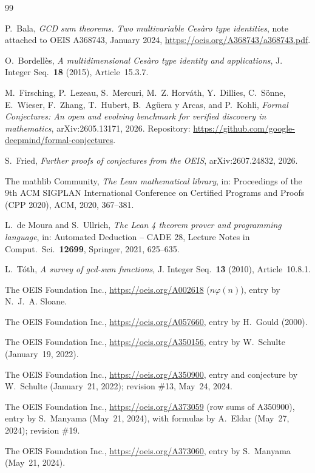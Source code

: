 \documentclass[11pt]{amsart}
\theoremstyle{plain}
\theoremstyle{definition}
\begin{document}
{\footnotesize
\begin{thebibliography}{99}

P.~Bala, \emph{GCD sum theorems. Two multivariable Ces\`aro type identities}, note attached to OEIS A368743, January 2024, \url{https://oeis.org/A368743/a368743.pdf}.

O.~Bordell\`es, \emph{A multidimensional Ces\`aro type identity and applications}, J. Integer Seq.\ \textbf{18} (2015), Article~15.3.7.

M.~Firsching, P.~Lezeau, S.~Mercuri, M.~Z. Horv\'ath, Y.~Dillies, C.~S\"onne, E.~Wieser, F.~Zhang, T.~Hubert, B.~Ag\"uera y Arcas, and P.~Kohli, \emph{Formal Conjectures: An open and evolving benchmark for verified discovery in mathematics}, arXiv:2605.13171, 2026. Repository: \url{https://github.com/google-deepmind/formal-conjectures}.

S.~Fried, \emph{Further proofs of conjectures from the OEIS}, arXiv:2607.24832, 2026.

The mathlib Community, \emph{The Lean mathematical library}, in: Proceedings of the 9th ACM SIGPLAN International Conference on Certified Programs and Proofs (CPP 2020), ACM, 2020, 367--381.

L.~de Moura and S.~Ullrich, \emph{The Lean 4 theorem prover and programming language}, in: Automated Deduction -- CADE 28, Lecture Notes in Comput.\ Sci.\ \textbf{12699}, Springer, 2021, 625--635.

L.~T\'oth, \emph{A survey of gcd-sum functions}, J. Integer Seq.\ \textbf{13} (2010), Article~10.8.1.

The OEIS Foundation Inc., \url{https://oeis.org/A002618} ($n\varphi(n)$), entry by N.~J.~A. Sloane.

The OEIS Foundation Inc., \url{https://oeis.org/A057660}, entry by H.~Gould (2000).

The OEIS Foundation Inc., \url{https://oeis.org/A350156}, entry by W.~Schulte (January~19, 2022).

The OEIS Foundation Inc., \url{https://oeis.org/A350900}, entry and conjecture by W.~Schulte (January~21, 2022); revision \#13, May~24, 2024.

The OEIS Foundation Inc., \url{https://oeis.org/A373059} (row sums of A350900), entry by S.~Manyama (May~21, 2024), with formulas by A.~Eldar (May~27, 2024); revision \#19.

The OEIS Foundation Inc., \url{https://oeis.org/A373060}, entry by S.~Manyama (May~21, 2024).

\end{thebibliography}
}
\end{document}
